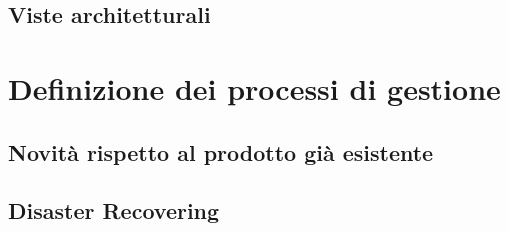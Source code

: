 \subsection{Viste architetturali}

\section{Definizione dei processi di gestione}
\subsection{Novità rispetto al prodotto già esistente}
\subsection{Disaster Recovering}
